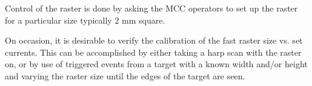 {{Control of the raster is done by asking the MCC
operators to set up the raster for a particular size
typically 2 mm square.

On occasion, it is desirable to verify the calibration
of the fast raster size vs. set currents. This can be accomplished
by either taking a harp scan with the raster on, or by use
of triggered events from a target with a known width and/or height and
varying the raster size until the edges of the target are seen.


}


%
%
%
}%
